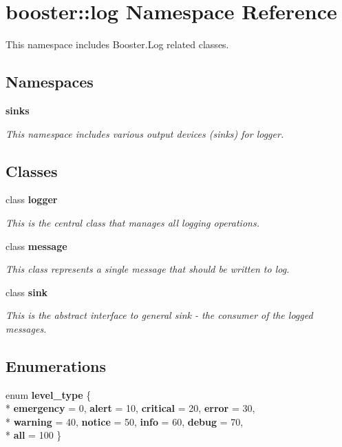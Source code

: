 \section{booster\+:\+:log Namespace Reference}
\label{namespacebooster_1_1log}


This namespace includes Booster.\+Log related classes.  


\subsection*{Namespaces}
\begin{DoxyCompactItemize}
\item 
 {\bf sinks}
\begin{DoxyCompactList}\small\item\em This namespace includes various output devices (sinks) for logger. \end{DoxyCompactList}\end{DoxyCompactItemize}
\subsection*{Classes}
\begin{DoxyCompactItemize}
\item 
class {\bf logger}
\begin{DoxyCompactList}\small\item\em This is the central class that manages all logging operations. \end{DoxyCompactList}\item 
class {\bf message}
\begin{DoxyCompactList}\small\item\em This class represents a single message that should be written to log. \end{DoxyCompactList}\item 
class {\bf sink}
\begin{DoxyCompactList}\small\item\em This is the abstract interface to general sink -\/ the consumer of the logged messages. \end{DoxyCompactList}\end{DoxyCompactItemize}
\subsection*{Enumerations}
\begin{DoxyCompactItemize}
\item 
enum {\bf level\+\_\+type} \{ \\*
{\bfseries emergency} = 0, 
{\bfseries alert} = 10, 
{\bfseries critical} = 20, 
{\bfseries error} = 30, 
\\*
{\bfseries warning} = 40, 
{\bfseries notice} = 50, 
{\bfseries info} = 60, 
{\bfseries debug} = 70, 
\\*
{\bfseries all} = 100
 \}
\end{DoxyCompactItemize}


